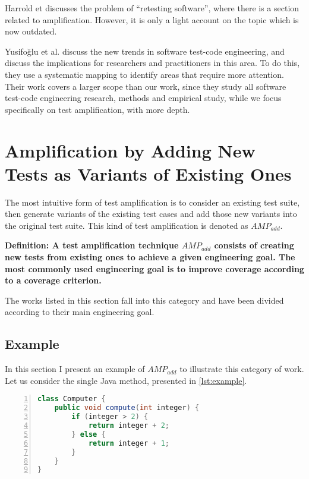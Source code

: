 Harrold et \etal\cite{harrold2008retesting} discusses the problem of ``retesting software'', where there is a section related to amplification.
However, it is only a light account on the topic which is now outdated.

Yusifoğlu et al. \cite{GAROUSIYUSIFOGLU2015123} discuss the new trends in software test-code engineering, and discuss the implications for researchers and practitioners in this area. 
To do this, they use a systematic mapping to identify areas that require more attention.
Their work covers a larger scope than our work, since they study all software test-code engineering research, methods and empirical study, while we focus specifically on test amplification, with more depth.

\section{Amplification by Adding New Tests as Variants of Existing Ones}
\label{sec:sota:category-1}

The most intuitive form of test amplification is to consider an existing test suite, then generate variants of the existing test cases and add those new variants into the original test suite. 
This kind of test amplification is denoted as $AMP_{add}$. 

\medskip
\textbf{Definition: A test amplification technique $AMP_{add}$ consists of creating new tests from existing ones to achieve a given engineering goal.
	The most commonly used engineering goal is to improve coverage according to a coverage criterion.}

The works listed in this section fall into this category and have been divided according to their main engineering goal.

\subsection{Example}
\label{subsec:sota:category-1:example}

In this section I present an example of $AMP_{add}$ to illustrate this category of work.
Let us consider the single Java method, presented in \autoref{lst:example}.

\begin{lstlisting}[caption={Example of a toy method},label=lst:example,float,language=java,numbers=left]
class Computer {
	public void compute(int integer) {
		if (integer > 2) {
			return integer + 2;
		} else {
			return integer + 1;
		}
	}
}
\end{lstlisting}

